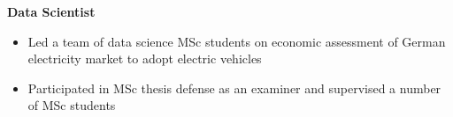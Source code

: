 \documentclass[10pt,letterpaper,roman]{moderncv} %
\begin{document}
\begin{itemize}
	\textbf{\indent Data Scientist}
	\begin{itemize}
		\item Led a team of data science MSc students on economic assessment of German electricity market to adopt electric vehicles
		\item Participated in MSc thesis defense as an examiner and supervised a number of MSc students
	\end{itemize}


%	

%	
%	
	\end{itemize}
	

\end{document}
